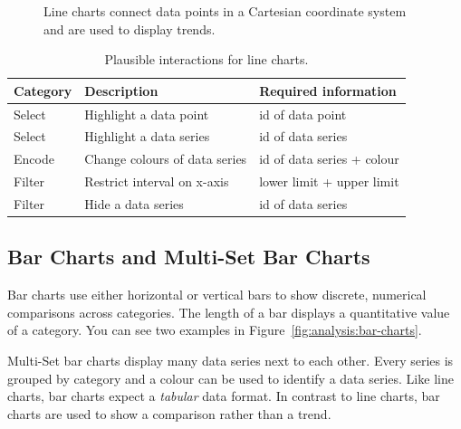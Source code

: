 \begin{figure}
  \begin{center}
    \qquad
  \caption{Line charts connect data points in a Cartesian coordinate system and are used to display trends.}
  \label{fig:analysis:line-graphs}
  \end{center}
\end{figure}

\begin{table}[H]
  \centering
  \caption{Plausible interactions for line charts.}%
  \label{tab:analysis:line-graph:interactions}
  \begin{tabularx}{\linewidth}{lXX}
    \bf Category & \bf Description & \bf Required information \\
    \hline
    Select & Highlight a data point & id of data point \\
    Select & Highlight a data series & id of data series \\
    Encode & Change colours of data series & id of data series + colour \\
    Filter & Restrict interval on x-axis & lower limit + upper limit \\
    Filter & Hide a data series & id of data series \\
  \end{tabularx}
\end{table}




\subsection{Bar Charts and Multi-Set Bar Charts}

Bar charts use either horizontal or vertical bars to show discrete, numerical comparisons across categories.
The length of a bar displays a quantitative value of a category.
You can see two examples in Figure~\ref{fig:analysis:bar-charts}.

Multi-Set bar charts display many data series next to each other.
Every series is grouped by category and a colour can be used to identify a data series.
Like line charts, bar charts expect a \emph{tabular} data format.
In contrast to line charts, bar charts are used to show a comparison rather than a trend.


